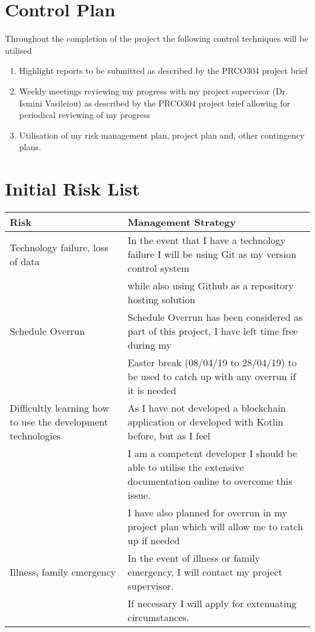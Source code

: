 \documentclass[11pt]{article}
\begin{document}
\section{Control Plan}
\label{sec:orgb542949}
Throughout the completion of the project the following control techniques will be utilised
\begin{enumerate}
\item Highlight reports to be submitted as described by the PRCO304 project brief
\label{sec:org721fa7e}
\item Weekly meetings reviewing my progress with my project supervisor (Dr. Ismini Vasileiou) as described by the PRCO304 project brief allowing for periodical reviewing of my progress
\label{sec:org1f451b3}
\item Utilisation of my risk management plan, project plan and, other contingency plans.
\label{sec:org7c0ae71}
\end{enumerate}


\section{Initial Risk List}
\label{sec:org27b4ed8}
\begin{adjustbox}{width={\textwidth},keepaspectratio}
\centering
\begin{center}
\begin{tabular}{|l|l|}
\hline
Risk & Management Strategy\\
\hline
Technology failure, loss of data & In the event that I have a technology failure I will be using Git as my version control system\\
 & while also using Github as a repository hosting solution\\
Schedule Overrun & Schedule Overrun has been considered as part of this project, I have left time free during my\\
 & Easter break (08/04/19 to 28/04/19) to be used to catch up with any overrun if it is needed\\
Difficultly learning how to use the development technologies & As I have not developed a blockchain application or developed with Kotlin before, but as I feel\\
 & I am a competent developer I should be able to utilise the extensive documentation online to overcome this issue.\\
 & I have also planned for overrun in my project plan which will allow me to catch up if needed\\
Illness, family emergency & In the event of illness or family emergency, I will contact my project supervisor.\\
 & If necessary I will apply for extenuating circumstances.\\
\hline
\end{tabular}
\end{center}
\end{adjustbox}
\end{document}
